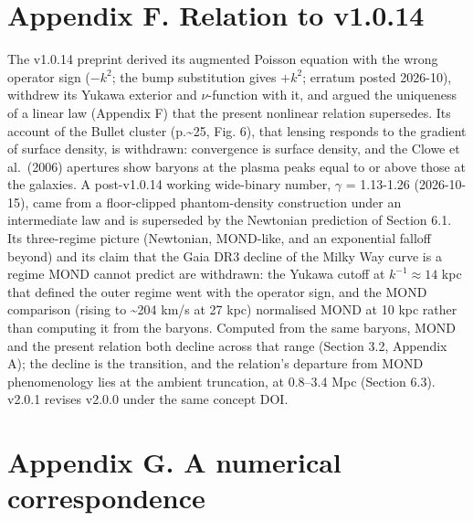 \documentclass[
  10pt,
]{article}
\begin{document}
\section{Appendix F. Relation to v1.0.14}\label{appendix-f.-relation-to-v1.0.14}

The v1.0.14 preprint derived its augmented Poisson equation with the wrong operator sign ($-k^2$; the bump substitution gives $+k^2$; erratum posted 2026-10), withdrew its Yukawa exterior and $\nu$-function with it, and argued the uniqueness of a linear law (Appendix F) that the present nonlinear relation supersedes. Its account of the Bullet cluster (p.\textasciitilde{}25, Fig. 6), that lensing responds to the gradient of surface density, is withdrawn: convergence is surface density, and the Clowe et al.~(2006) apertures show baryons at the plasma peaks equal to or above those at the galaxies. A post-v1.0.14 working wide-binary number, $\gamma$ = 1.13-1.26 (2026-10-15), came from a floor-clipped phantom-density construction under an intermediate law and is superseded by the Newtonian prediction of Section 6.1. Its three-regime picture (Newtonian, MOND-like, and an exponential falloff beyond) and its claim that the Gaia DR3 decline of the Milky Way curve is a regime MOND cannot predict are withdrawn: the Yukawa cutoff at $k^{-1}\approx14$ kpc that defined the outer regime went with the operator sign, and the MOND comparison (rising to \textasciitilde{}204 km/s at 27 kpc) normalised MOND at 10 kpc rather than computing it from the baryons. Computed from the same baryons, MOND and the present relation both decline across that range (Section 3.2, Appendix A); the decline is the transition, and the relation's departure from MOND phenomenology lies at the ambient truncation, at 0.8--3.4 Mpc (Section 6.3). v2.0.1 revises v2.0.0 under the same concept DOI.

\section{Appendix G. A numerical correspondence}\label{appendix-g}
\end{document}
